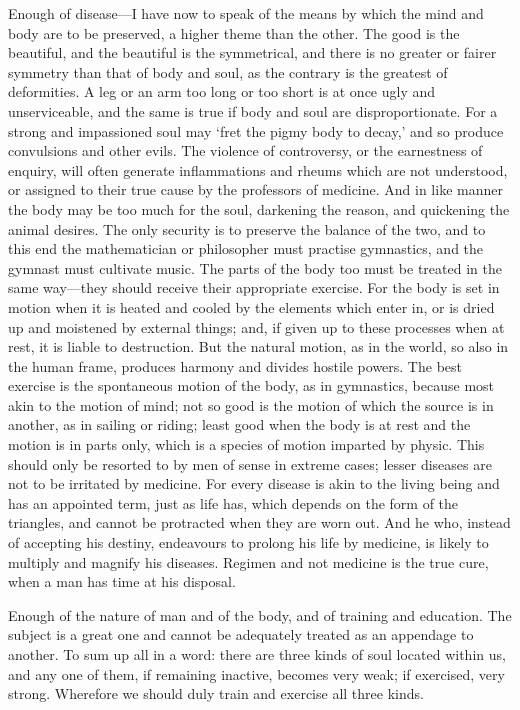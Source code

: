 \documentclass[11pt,letter]{article}
\begin{document}
\par  Enough of disease—I have now to speak of the means by which the mind and body are to be preserved, a higher theme than the other. The good is the beautiful, and the beautiful is the symmetrical, and there is no greater or fairer symmetry than that of body and soul, as the contrary is the greatest of deformities. A leg or an arm too long or too short is at once ugly and unserviceable, and the same is true if body and soul are disproportionate. For a strong and impassioned soul may ‘fret the pigmy body to decay,’ and so produce convulsions and other evils. The violence of controversy, or the earnestness of enquiry, will often generate inflammations and rheums which are not understood, or assigned to their true cause by the professors of medicine. And in like manner the body may be too much for the soul, darkening the reason, and quickening the animal desires. The only security is to preserve the balance of the two, and to this end the mathematician or philosopher must practise gymnastics, and the gymnast must cultivate music. The parts of the body too must be treated in the same way—they should receive their appropriate exercise. For the body is set in motion when it is heated and cooled by the elements which enter in, or is dried up and moistened by external things; and, if given up to these processes when at rest, it is liable to destruction. But the natural motion, as in the world, so also in the human frame, produces harmony and divides hostile powers. The best exercise is the spontaneous motion of the body, as in gymnastics, because most akin to the motion of mind; not so good is the motion of which the source is in another, as in sailing or riding; least good when the body is at rest and the motion is in parts only, which is a species of motion imparted by physic. This should only be resorted to by men of sense in extreme cases; lesser diseases are not to be irritated by medicine. For every disease is akin to the living being and has an appointed term, just as life has, which depends on the form of the triangles, and cannot be protracted when they are worn out. And he who, instead of accepting his destiny, endeavours to prolong his life by medicine, is likely to multiply and magnify his diseases. Regimen and not medicine is the true cure, when a man has time at his disposal.

\par  Enough of the nature of man and of the body, and of training and education. The subject is a great one and cannot be adequately treated as an appendage to another. To sum up all in a word: there are three kinds of soul located within us, and any one of them, if remaining inactive, becomes very weak; if exercised, very strong. Wherefore we should duly train and exercise all three kinds.
\end{document}

